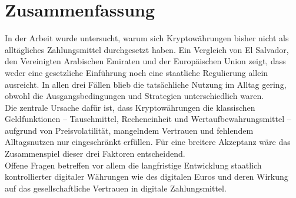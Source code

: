 \chapter{Zusammenfassung}
\label{chap:zusammenfassung}

In der Arbeit wurde untersucht, warum sich Kryptowährungen bisher nicht als alltägliches Zahlungsmittel durchgesetzt haben. Ein Vergleich von El Salvador, den Vereinigten Arabischen Emiraten und der Europäischen Union zeigt, dass weder eine gesetzliche Einführung noch eine staatliche Regulierung allein ausreicht. In allen drei Fällen blieb die tatsächliche Nutzung im Alltag gering, obwohl die Ausgangsbedingungen und Strategien unterschiedlich waren.\\

Die zentrale Ursache dafür ist, dass Kryptowährungen die klassischen Geldfunktionen – Tauschmittel, Recheneinheit und Wertaufbewahrungsmittel – aufgrund von Preisvolatilität, mangelndem Vertrauen und fehlendem Alltagsnutzen nur eingeschränkt erfüllen. Für eine breitere Akzeptanz wäre das Zusammenspiel dieser drei Faktoren entscheidend.\\

Offene Fragen betreffen vor allem die langfristige Entwicklung staatlich kontrollierter digitaler Währungen wie des digitalen Euros und deren Wirkung auf das gesellschaftliche Vertrauen in digitale Zahlungsmittel.